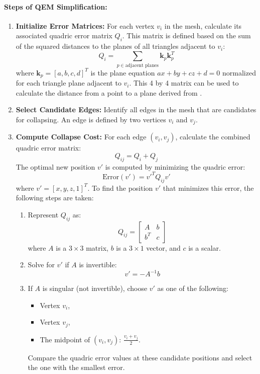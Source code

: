 \documentclass[12pt]{extarticle}
\begin{document}
\paragraph{Steps of QEM Simplification:}
\begin{enumerate}
    \item \textbf{Initialize Error Matrices:}
    For each vertex \(v_i\) in the mesh, calculate its associated quadric error matrix \(Q_i\). This matrix is defined based on the 
    sum of the squared distances to the planes of all triangles adjacent to \(v_i\):
    \[
    Q_i = \sum_{p \in \text{adjacent planes}} \mathbf{k}_p \mathbf{k}_p^T
    \]
    where \(\mathbf{k}_p = [a, b, c, d]^T\) is the plane equation \(ax + by + cz + d = 0\) normalized for each triangle plane adjacent 
    to \(v_i\). This 4 by 4 matrix can be used to calculate the distance from a point to a plane derived from \cite{Garland1997}.


    \item \textbf{Select Candidate Edges:}
    Identify all edges in the mesh that are candidates for collapsing. An edge is defined by two vertices \(v_i\) and \(v_j\).

    \item \textbf{Compute Collapse Cost:}
    For each edge \((v_i, v_j)\), calculate the combined quadric error matrix:
    \[
    Q_{ij} = Q_i + Q_j
    \]
    The optimal new position \(v'\) is computed by minimizing the quadric error:
    \[
    \text{Error}(v') = v'^T Q_{ij} v'
    \]
    where \(v' = [x, y, z, 1]^T\). To find the position \(v'\) that minimizes this error, the following steps are taken:
    \begin{enumerate}
        \item Represent \(Q_{ij}\) as:
        \[
        Q_{ij} = 
        \begin{bmatrix}
        A & b \\
        b^T & c
        \end{bmatrix}
        \]
        where \(A\) is a \(3 \times 3\) matrix, \(b\) is a \(3 \times 1\) vector, and \(c\) is a scalar.
        \item Solve for \(v'\) if \(A\) is invertible:
        \[
        v' = -A^{-1} b
        \]
        \item If \(A\) is singular (not invertible), choose \(v'\) as one of the following:
        \begin{itemize}
            \item Vertex \(v_i\),
            \item Vertex \(v_j\),
            \item The midpoint of \((v_i, v_j)\): \(\frac{v_i + v_j}{2}\).
        \end{itemize}
        Compare the quadric error values at these candidate positions and select the one with the smallest error.
    \end{enumerate}


\end{enumerate}
\end{document}
